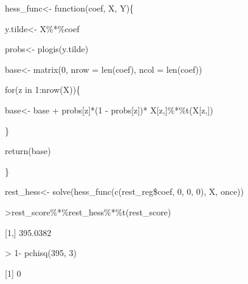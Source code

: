 \documentclass{beamer}
\begin{document}
\begin{frame}
\small
\begin{semiverbatim}

 hess\_func<- function(coef, X, Y)\{

   \hspace{0.15in}  y.tilde<- X\%*\%coef

  \hspace{0.15in}   probs<- plogis(y.tilde)

  \hspace{0.15in}   base<- matrix(0, nrow = len(coef), ncol = len(coef))

   \hspace{0.15in}  for(z in 1:nrow(X))\{

   \hspace{0.25in}    base<- base + probs[z]*(1 - probs[z])* X[z,]\%*\%t(X[z,])

     \hspace{0.15in}  \}

     \hspace{0.15in} return(base)

   \}


 rest\_hess<- solve(hess\_func(c(rest\_reg\$coef, 0, 0, 0), X, once))

>rest\_score\%*\%rest\_hess\%*\%t(rest\_score)

[1,] 395.0382

> 1- pchisq(395, 3)

[1] 0

\end{semiverbatim}

\end{frame}
\end{document}
